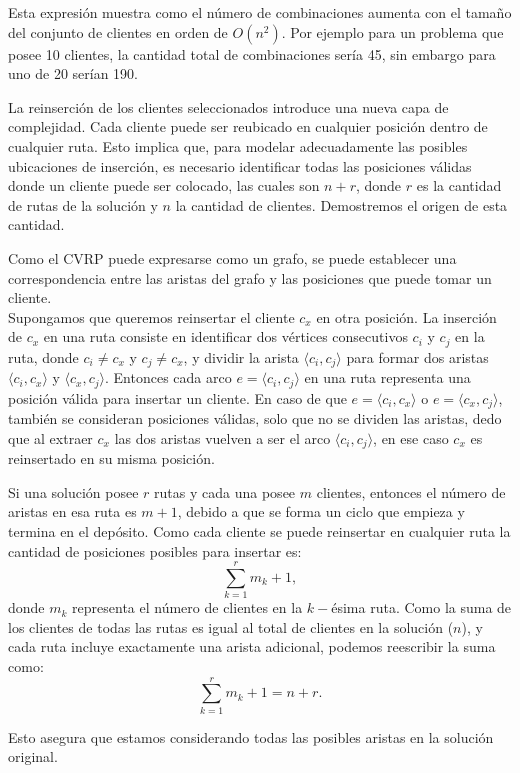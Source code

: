 \documentclass{article}
\begin{document}
Esta expresión muestra como el número de combinaciones aumenta con el tamaño del conjunto de clientes en orden de $O(n^2)$. Por ejemplo para un problema que posee 10 clientes, la cantidad total de combinaciones sería 45, sin embargo para uno de 20 serían 190.

La reinserción de los clientes seleccionados introduce una nueva capa de complejidad. Cada cliente puede ser reubicado en cualquier posición dentro de cualquier ruta. Esto implica que, para modelar adecuadamente las posibles ubicaciones de inserción, es necesario identificar todas las posiciones válidas donde un cliente puede ser colocado, las cuales son $n + r$, donde $r$ es la cantidad de rutas de la solución y $n$ la cantidad de clientes. Demostremos el origen de esta cantidad.

Como el CVRP puede expresarse como un grafo, se puede establecer una correspondencia entre las aristas del grafo y las posiciones que puede tomar un cliente.\\
Supongamos que queremos reinsertar el cliente $c_x$ en otra posición. La inserción de $c_x$ en una ruta consiste en identificar dos vértices consecutivos $c_i$ y $c_j$ en la ruta, donde $c_i \neq c_x$ y $c_j \neq c_x$, y dividir la arista $\langle c_i,c_j \rangle$ para formar dos aristas $\langle c_i,c_x \rangle$ y $\langle c_x,c_j \rangle$. Entonces cada arco $e = \langle c_i,c_j \rangle$ en una ruta representa una posición válida para insertar un cliente. En caso de que $e = \langle c_i,c_x \rangle$ o $e = \langle c_x,c_j \rangle$, también se consideran posiciones válidas, solo que no se dividen las aristas, dedo que al extraer $c_x$ las dos aristas vuelven a ser el arco $\langle c_i,c_j \rangle$, en ese caso $c_x$ es reinsertado en su misma posición.

Si una solución posee $r$ rutas y cada una posee $m$ clientes, entonces el número de aristas en esa ruta es $m+1$, debido a que se forma un ciclo que empieza y termina en el depósito. Como cada cliente se puede reinsertar en cualquier ruta la cantidad de posiciones posibles para insertar es: 
\[\sum \limits_{k=1} ^r m_k+1,\] 
donde $m_k$ representa el número de clientes en la $k-$ésima ruta. Como la suma de los clientes de todas las rutas es igual al total de clientes en la solución ($n$), y cada ruta incluye exactamente una arista adicional, podemos reescribir la suma como:
\[
\sum \limits_{k=1} ^r m_k+1 = n+r. 
\]

Esto asegura que estamos considerando todas las posibles aristas en la solución original.
\end{document}
